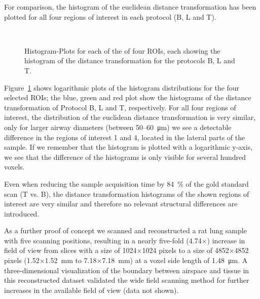 For comparison, the histogram of the euclidean distance transformation has been plotted for all four regions of interest in each protocol (B, L and T).

\renewcommand{\imsize}{.5\columnwidth}
\begin{figure}
	\centering
	\caption{Histogram-Plots for each of the of four ROIs, each showing the histogram of the distance transformation for the protocols B, L and T.}%
	\\%
	\label{fig:DTFplots}
\end{figure}

Figure~\ref{fig:DTFplots} shows logarithmic plots of the histogram distributions for the four selected ROIs; the blue, green and red plot show the histograms of the distance transformation of Protocol B, L and T, respectively. For all four regions of interest, the distribution of the euclidean distance transformation is very similar, only for larger airway diameters (between 50--\SI{60}{\micro\meter}) we see a detectable difference in the regions of interest 1 and 4, located in the lateral parts of the sample. If we remember that the histogram is plotted with a logarithmic y-axis, we see that the difference of the histograms is only visible for several hundred voxels.

Even when reducing the sample acquisition time by \SI{84}{\percent} of the gold standard scan (T vs. B), the distance transformation histograms of the shown regions of interest are very similar and therefore no relevant structural differences are introduced.

As a further proof of concept we scanned and reconstructed a rat lung sample with five scanning positions, resulting in a nearly five-fold (4.74$\times$) increase in field of view from slices with a size of 1024$\times$1024 pixels to a size of 4852$\times$4852 pixels (1.52$\times$\SI{1.52}{\milli\meter} to 7.18$\times$\SI{7.18}{\milli\meter}) at a voxel side length of \SI{1.48}{\micro\meter}. A three-dimensional visualization of the boundary between airspace and tissue in this reconstructed dataset validated the wide field scanning method for further increases in the available field of view (data not shown).